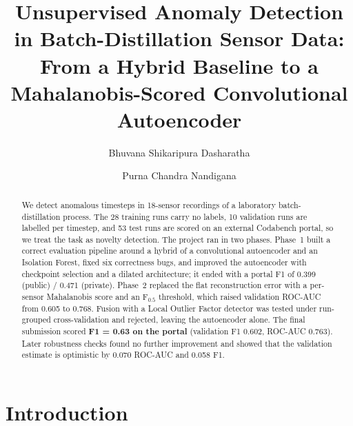 \documentclass[runningheads]{llncs}
\begin{document}
\title{Unsupervised Anomaly Detection in Batch-Distillation Sensor Data: From a Hybrid Baseline to a Mahalanobis-Scored Convolutional Autoencoder}

\author{Bhuvana Shikaripura Dasharatha \and Purna Chandra Nandigana}

\maketitle

\begin{abstract}
We detect anomalous timesteps in 18-sensor recordings of a laboratory batch-distillation process. The 28 training runs carry no labels, 10 validation runs are labelled per timestep, and 53 test runs are scored on an external Codabench portal, so we treat the task as novelty detection. The project ran in two phases. Phase~1 built a correct evaluation pipeline around a hybrid of a convolutional autoencoder and an Isolation Forest, fixed six correctness bugs, and improved the autoencoder with checkpoint selection and a dilated architecture; it ended with a portal F1 of 0.399 (public) / 0.471 (private). Phase~2 replaced the flat reconstruction error with a per-sensor Mahalanobis score and an F$_{0.5}$ threshold, which raised validation ROC-AUC from 0.605 to 0.768. Fusion with a Local Outlier Factor detector was tested under run-grouped cross-validation and rejected, leaving the autoencoder alone. The final submission scored \textbf{F1 = 0.63 on the portal} (validation F1 0.602, ROC-AUC 0.763). Later robustness checks found no further improvement and showed that the validation estimate is optimistic by 0.070 ROC-AUC and 0.058 F1.
\end{abstract}

\section{Introduction}
\end{document}
